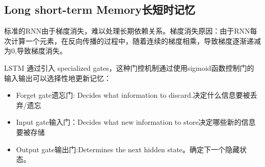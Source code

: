 \documentclass[UTF8]{ctexart}
\begin{document}
\subsection{Long short-term Memory长短时记忆}

标准的RNN由于梯度消失，难以处理长期依赖关系。梯度消失原因：由于RNN每次计算一个元素，在反向传播的过程中，随着连续的梯度相乘，导致梯度逐渐递减为0,导致梯度消失。

LSTM 通过引入 specialized gates，这种门控机制通过使用sigmoid函数控制门的输入输出可以选择性地更新记忆：
\begin{itemize}
    \item Forget gate遗忘门: Decides what information to discard.决定什么信息要被丢弃/遗忘
    \item Input gate输入门：Decides what new information to store决定哪些新的信息要被存储
    \item Output gate输出门:Determines the next hidden state。确定下一个隐藏状态。
\end{itemize}
\end{document}
